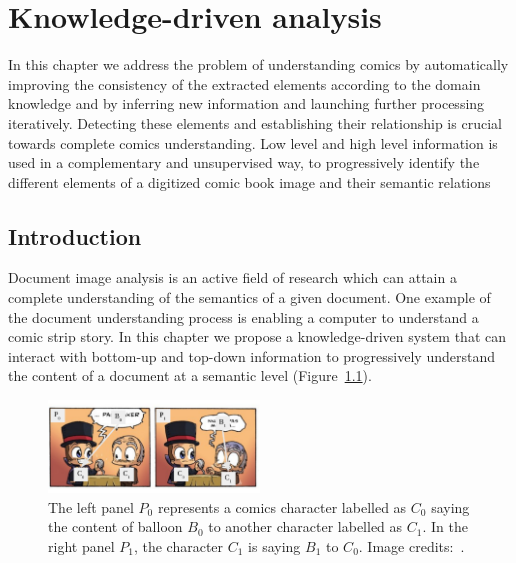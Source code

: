 \chapter{Knowledge-driven analysis}
\label{chap:knowledge}
\graphicspath{{./chapters/5-knowledge/figs/}}

In this chapter we address the problem of understanding comics by automatically improving the consistency of the extracted elements according to the domain knowledge and by inferring new information and launching further processing iteratively.
Detecting these elements and establishing their relationship is crucial towards complete comics understanding.
Low level and high level information is used in a complementary and unsupervised way, to progressively identify the different elements of a digitized comic book image and their semantic relations


\section{Introduction}
\label{sec:kn:introduction}


Document image analysis is an active field of research which can attain a complete understanding of the semantics of a given document.
One example of the document understanding process is enabling a computer to understand a comic strip story.
In this chapter we propose a knowledge-driven system that can interact with bottom-up and top-down information to progressively understand the content of a document at a semantic level (Figure~\ref{fig:kn:intro_illustration}).

 \begin{figure}[ht]  %
   \centering
  \includegraphics[trim= 0px 10px 3px 10px, clip, width=0.5\textwidth]{intro_illustration.pdf}
  \caption{The left panel $P_0$ represents a comics character labelled as $C_0$ saying the content of balloon $B_0$ to another character labelled as $C_1$. In the right panel $P_1$, the character $C_1$ is saying $B_1$ to $C_0$. Image credits:~\cite{Magicien11}. }
  \label{fig:kn:intro_illustration}
 \end{figure}


